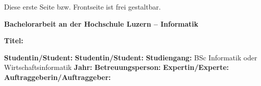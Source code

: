 
{\color{red}Diese erste Seite bzw. Frontseite ist frei gestaltbar.}
\newpage

\noindent
\fontsize{12}{14}
\textbf{Bachelorarbeit an der Hochschule Luzern -- Informatik} \\ \vspace*{0.6cm}

\fontsize{10.5}{12}
\noindent
\textbf{Titel:} \\ \vspace*{0.2cm}

\noindent
\textbf{Studentin/Student:} \newline \newline
\textbf{Studentin/Student:} \newline \newline
\textbf{Studiengang:} BSc Informatik oder Wirtschaftsinformatik  \newline \newline
\textbf{Jahr:} \newline \newline
\textbf{Betreuungsperson:} \newline \newline
\textbf{Expertin/Experte:} \newline \newline
\textbf{Auftraggeberin/Auftraggeber:} \newline \newline \newline





